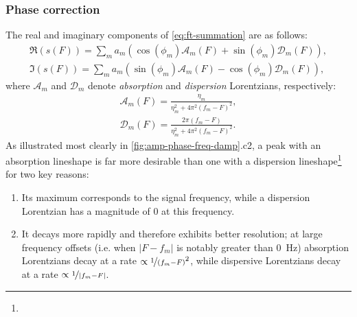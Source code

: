 \subsubsection{Phase correction}
The real and imaginary components of \cref{eq:ft-summation} are as follows:
\begin{subequations}
    \begin{gather}
        \Re(s(F)) = \sum_m
        a_m (\cos(\phi_m) \mathcal{A}_m(F) + \sin(\phi_m) \mathcal{D}_m(F)),\\
        \Im(s(F)) = \sum_m
        a_m (\sin(\phi_m) \mathcal{A}_m(F) - \cos(\phi_m) \mathcal{D}_m(F)),
    \end{gather}
\end{subequations}
where $\mathcal{A}_m$ and  $\mathcal{D}_m$ denote \emph{absorption} and
\emph{dispersion} Lorentzians, respectively:
\begin{subequations}
    \begin{gather}
        \mathcal{A}_m(F) = \frac{\eta_m}{\eta_m^2 + 4 \pi^2 (f_m - F)^2},\\
        \mathcal{D}_m(F) = \frac{2 \pi (f_m - F)}{\eta_m^2 + 4 \pi^2 (f_m - F)^2}.
    \end{gather}
\end{subequations}
As illustrated most clearly in \cref{fig:amp-phase-freq-damp}.c2, a peak with
an absorption lineshape is far more desirable than one with a dispersion
lineshape\footnote{
}
for two key reasons:
\begin{enumerate}
    \item Its maximum corresponds to the signal frequency, while a dispersion
        Lorentzian has a magnitude of $0$ at this frequency.
    \item It decays more rapidly and therefore exhibits better resolution;
        at large frequency offsets (i.e. when $\lvert F - f_m \rvert$ is
        notably greater than \qty{0}{\hertz}) absorption Lorentzians decay at
        a rate $\propto \nicefrac{1}{(f_m - F)}^2$, while dispersive
        Lorentzians decay at a rate $\propto \nicefrac{1}{\lvert f_m - F \rvert}$.
\end{enumerate}
